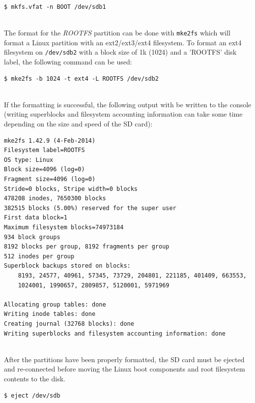 \begin{lstlisting}
$ mkfs.vfat -n BOOT /dev/sdb1
\end{lstlisting}

~\\
\noindent
The format for the \textit{ROOTFS} partition can be done with \texttt{mke2fs} which will format a Linux partition with an ext2/ext3/ext4 filesystem. To format an ext4 filesystem on \texttt{/dev/sdb2} with a block size of 1k (1024) and a 'ROOTFS' disk label, the following command can be used: \\


\begin{lstlisting}
$ mke2fs -b 1024 -t ext4 -L ROOTFS /dev/sdb2
\end{lstlisting}


~\\
\noindent
If the formatting is successful, the following output with be written to the console (writing superblocks and filesystem accounting information can take some time depending on the size and speed of the SD card): \\

\begin{lstlisting}[style=text]
mke2fs 1.42.9 (4-Feb-2014)
Filesystem label=ROOTFS
OS type: Linux
Block size=4096 (log=0)
Fragment size=4096 (log=0)
Stride=0 blocks, Stripe width=0 blocks
478208 inodes, 7650300 blocks
382515 blocks (5.00%) reserved for the super user
First data block=1
Maximum filesystem blocks=74973184
934 block groups
8192 blocks per group, 8192 fragments per group
512 inodes per group
Superblock backups stored on blocks: 
	8193, 24577, 40961, 57345, 73729, 204801, 221185, 401409, 663553, 
	1024001, 1990657, 2809857, 5120001, 5971969

Allocating group tables: done                            
Writing inode tables: done                            
Creating journal (32768 blocks): done
Writing superblocks and filesystem accounting information: done   
\end{lstlisting}


~\\
\noindent
After the partitions have been properly formatted, the SD card must be ejected and re-connected before moving the Linux boot components and root filesystem contents to the disk. \\

\begin{lstlisting}
$ eject /dev/sdb
\end{lstlisting}


